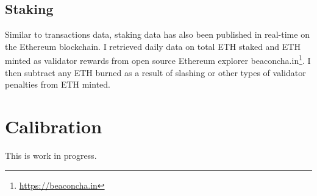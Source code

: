 \documentclass[12pt]{article}
\begin{document}
\subsection{Staking}
Similar to transactions data, staking data has also been published in real-time on the Ethereum blockchain. I retrieved daily data on total ETH staked and ETH minted as validator rewards from open source Ethereum explorer beaconcha.in\footnote{\url{https://beaconcha.in}}. I then subtract any ETH burned as a result of slashing or other types of validator penalties from ETH minted.


\section{Calibration}
This is work in progress.

\newpage


\newpage
\printbibliography
\end{document}
